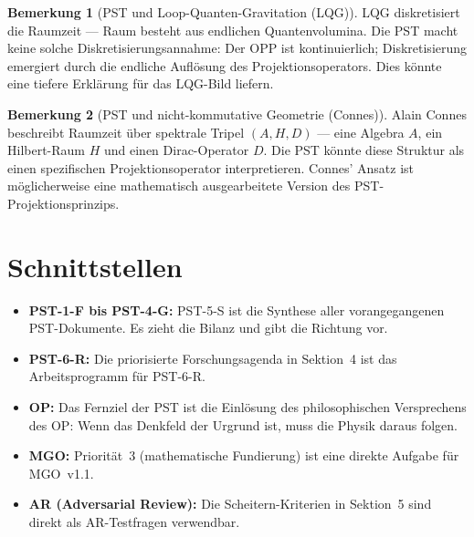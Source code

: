 \documentclass[11pt,a4paper]{article}
\theoremstyle{plain}
\theoremstyle{definition}
\newtheorem{remark}{Bemerkung}[section]
\begin{document}
\begin{remark}[PST und Loop-Quanten-Gravitation (LQG)]
LQG diskretisiert die Raumzeit --- Raum besteht aus endlichen
Quantenvolumina. Die PST macht keine solche Diskretisierungsannahme:
Der OPP ist kontinuierlich; Diskretisierung emergiert durch die endliche
Aufl\"{o}sung des Projektionsoperators. Dies k\"{o}nnte eine tiefere
Erkl\"{a}rung f\"{u}r das LQG-Bild liefern.
\end{remark}

\begin{remark}[PST und nicht-kommutative Geometrie (Connes)]
Alain Connes beschreibt Raumzeit \"{u}ber spektrale Tripel $(A, H, D)$
--- eine Algebra $A$, ein Hilbert-Raum $H$ und einen Dirac-Operator $D$.
Die PST k\"{o}nnte diese Struktur als einen spezifischen Projektionsoperator
interpretieren. Connes' Ansatz ist m\"{o}glicherweise eine mathematisch
ausgearbeitete Version des PST-Projektionsprinzips.
\end{remark}

\section{Schnittstellen}

\begin{itemize}
  \item \textbf{PST-1-F bis PST-4-G:} PST-5-S ist die Synthese aller
        vorangegangenen PST-Dokumente. Es zieht die Bilanz und gibt
        die Richtung vor.
  \item \textbf{PST-6-R:} Die priorisierte Forschungsagenda in Sektion~4
        ist das Arbeitsprogramm f\"{u}r PST-6-R.
  \item \textbf{OP:} Das Fernziel der PST ist die Einl\"{o}sung des
        philosophischen Versprechens des OP: Wenn das Denkfeld der
        Urgrund ist, muss die Physik daraus folgen.
  \item \textbf{MGO:} Priorit\"{a}t~3 (mathematische Fundierung) ist
        eine direkte Aufgabe f\"{u}r MGO~v1.1.
  \item \textbf{AR (Adversarial Review):} Die Scheitern-Kriterien in
        Sektion~5 sind direkt als AR-Testfragen verwendbar.
\end{itemize}
\end{document}
